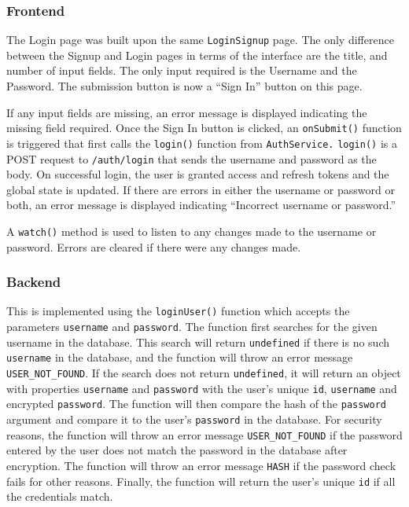 \documentclass{article}
\def\code#1{\texttt{#1}}
\begin{document}
\subsubsection{Frontend}
The Login page was built upon the same \code{LoginSignup} page. The only
difference between the Signup and Login pages in terms of the interface are the
title, and number of input fields. The only input required is the Username and
the Password. The submission button is now a “Sign In” button on this page.

If any input fields are missing, an error message is displayed indicating the
missing field required. Once the Sign In button is clicked, an \code{onSubmit()}
function is triggered that first calls the \code{login()} function from
\code{AuthService.} \code{login()} is a POST request to \code{/auth/login} that
sends the username and password as the body. On successful login, the user is
granted access and refresh tokens and the global state is updated. If there are
errors in either the username or password or both, an error message is displayed
indicating “Incorrect username or password.”

A \code{watch()} method is used to listen to any changes made to the username or
password. Errors are cleared if there were any changes made.

\subsubsection{Backend}
This is implemented using the \code{loginUser()} function which accepts the
parameters \code{username} and \code{password}. The function first searches for
the given username in the database. This search will return \code{undefined} if
there is no such \code{username} in the database, and the function will throw an
error message \code{USER\_NOT\_FOUND}. If the search does not return
\code{undefined}, it will return an object with properties \code{username} and
\code{password} with the user’s unique \code{id}, \code{username} and encrypted
\code{password}. The function will then compare the hash of the \code{password}
argument and compare it to the user’s \code{password} in the database. For
security reasons, the function will throw an error message
\code{USER\_NOT\_FOUND} if the password entered by the user does not match the
password in the database after encryption. The function will throw an error
message \code{HASH} if the password check fails for other reasons. Finally, the
function will return the user’s unique \code{id} if all the credentials match.
\end{document}
